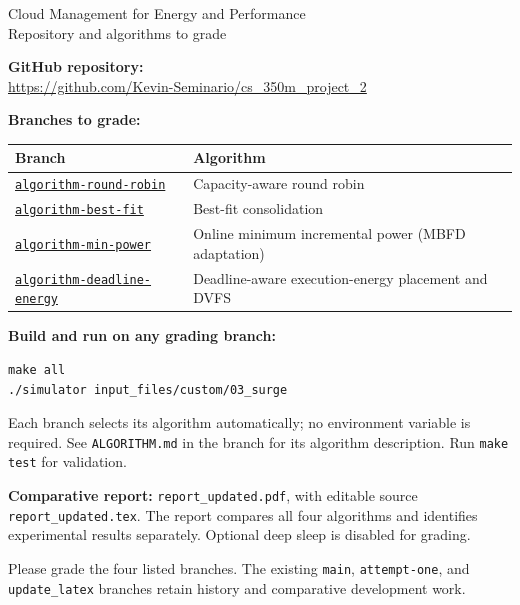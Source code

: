 \documentclass[11pt,letterpaper]{article}
\begin{document}
\begin{center}
{\Large Cloud Management for Energy and Performance}\\[6pt]
{\large Repository and algorithms to grade}
\end{center}
\textbf{GitHub repository:}\\
\url{https://github.com/Kevin-Seminario/cs_350m_project_2}

\textbf{Branches to grade:}
\begin{center}
\small
\begin{tabular}{p{2.25in}p{3.1in}}
\toprule
Branch & Algorithm \\ \midrule
\href{https://github.com/Kevin-Seminario/cs_350m_project_2/tree/algorithm-round-robin}{\texttt{algorithm-round-robin}} & Capacity-aware round robin \\[6pt]
\href{https://github.com/Kevin-Seminario/cs_350m_project_2/tree/algorithm-best-fit}{\texttt{algorithm-best-fit}} & Best-fit consolidation \\[6pt]
\href{https://github.com/Kevin-Seminario/cs_350m_project_2/tree/algorithm-min-power}{\texttt{algorithm-min-power}} & Online minimum incremental power (MBFD adaptation) \\[6pt]
\href{https://github.com/Kevin-Seminario/cs_350m_project_2/tree/algorithm-deadline-energy}{\texttt{algorithm-deadline-energy}} & Deadline-aware execution-energy placement and DVFS \\
\bottomrule
\end{tabular}
\end{center}
\textbf{Build and run on any grading branch:}
\begin{verbatim}
make all
./simulator input_files/custom/03_surge
\end{verbatim}
Each branch selects its algorithm automatically; no environment variable is
required. See \texttt{ALGORITHM.md} in the branch for its algorithm description.
Run \texttt{make test} for validation.

\textbf{Comparative report:} \texttt{report\_updated.pdf}, with editable source
\texttt{report\_updated.tex}. The report compares all four algorithms and identifies
experimental results separately. Optional deep sleep is disabled for grading.

Please grade the four listed branches. The existing \texttt{main},
\texttt{attempt-one}, and \texttt{update\_latex} branches retain history and
comparative development work.
\end{document}
